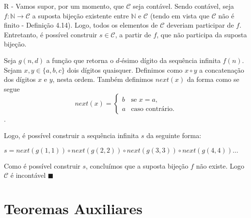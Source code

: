 \documentclass[12pt,a4paper,oneside]{article}
\begin{document}
\begin{enumerate}
	{\color{blue}
		R - Vamos supor, por um momento, que $\mathcal{C}$ seja contável. Sendo contável, seja $f:\mathbb{N} \rightarrow \mathcal{C}$ a suposta bijeção existente entre $\mathbb{N}$ e $\mathcal{C}$ (tendo em vista que $\mathcal{C}$ não é finito - Definição 4.14). Logo, todos os elementos de $\mathcal{C}$ deveriam participar de $f$. Entretanto, é possível construir $s \in \mathcal{C}$, a partir de $f$, que não participa da suposta bijeção.
		
		Seja $g(n,d)$ a função que retorna o $d$-ésimo dígito da sequência infinita $f(n)$. Sejam $x,y \in \{a,b,c\} $ dois dígitos quaisquer. Definimos como $x \circ y$ a concatenação dos dígitos $x$ e $y$, nesta ordem. Também definimos $next(x)$ da forma como se segue
			$$next(x) = \begin{cases}
				b	&	\mbox{se } x=a, \\
				a 	&	\mbox{caso contrário}.
			\end{cases}$$.
		
		Logo, é possível construir a sequência infinita $s$ da seguinte forma:
		\begin{center}
			$s = next(g(1,1))\circ next(g(2,2)) \circ next(g(3,3)) \circ next(g(4,4)) \ldots$
		\end{center}
		
		Como é possível construir $s$, concluímos que a suposta bijeção $f$ não existe. Logo $\mathcal{C}$ é incontável $\blacksquare$
	}	

\end{enumerate}

\section*{Teoremas Auxiliares}
\end{document}
